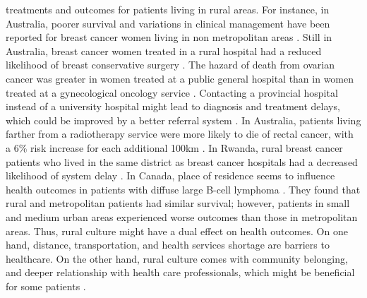 treatments and outcomes for patients living in rural areas. For instance, in
Australia, poorer survival and variations in clinical management have been
reported for breast cancer women living in non metropolitan areas
\cite{dasgupta_variations_2018}. Still in Australia, breast cancer women treated
in a rural hospital had a reduced likelihood of breast conservative surgery
\cite{hall_unequal_2004}.  The hazard of death from ovarian cancer was greater
in women treated at a public general hospital than in women treated at a
gynecological oncology service \cite{tracey_effects_2014}. Contacting a
provincial hospital instead of a university hospital might lead to diagnosis and
treatment delays, which could be improved by a better referral system
\cite{thongsuksai_delay_2000}. In Australia, patients living farther from a
radiotherapy service were more likely to die of rectal cancer, with a 6\% risk
increase for each additional 100km \cite{baade_distance_2011}. In Rwanda, rural
breast cancer patients who lived in the same district as breast cancer hospitals
had a decreased likelihood of system delay \cite{pace_delays_2015}. In Canada,
place of residence seems to influence health outcomes in patients with diffuse
large B-cell lymphoma \cite{lee_effect_2014}. They found that rural and
metropolitan patients had similar survival; however, patients in small and
medium urban areas experienced worse outcomes than those in metropolitan areas.
Thus, rural culture might have a dual effect on health outcomes. On one hand,
distance, transportation, and health services shortage are barriers to
healthcare. On the other hand, rural culture comes with community belonging, and
deeper relationship with health care professionals, which might be beneficial
for some patients \cite{brundisini_chronic_2013}.

